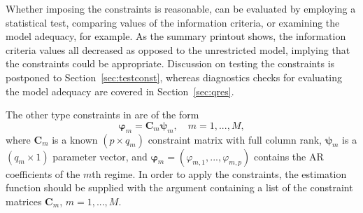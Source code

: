 \documentclass[nojss]{jss} %
\begin{document}
Whether imposing the constraints is reasonable, can be evaluated by employing a statistical test, comparing values of the information criteria, or examining the model adequacy, for example. As the summary printout shows, the information criteria values all decreased as opposed to the unrestricted model, implying that the constraints could be appropriate. Discussion on testing the constraints is postponed to Section~\ref{sec:testconst}, whereas diagnostics checks for evaluating the model adequacy are covered in Section~\ref{sec:qres}.

The other type constraints in  are of the form
\begin{equation}
\boldsymbol{\varphi}_m = \boldsymbol{C}_m\boldsymbol{\psi}_m, \quad m=1,...,M,
\end{equation}
where $\boldsymbol{C}_m$ is a known $(p\times q_m)$ constraint matrix with full column rank, $\boldsymbol{\psi}_m$ is a $(q_m \times 1)$ parameter vector, and $\boldsymbol{\varphi}_m=(\varphi_{m,1},...,\varphi_{m,p})$ contains the AR coefficients of the $m$th regime. In order to apply the constraints, the estimation function should be supplied with the argument  containing a list of the constraint matrices $\boldsymbol{C}_m$, $m=1,...,M$.
\end{document}
